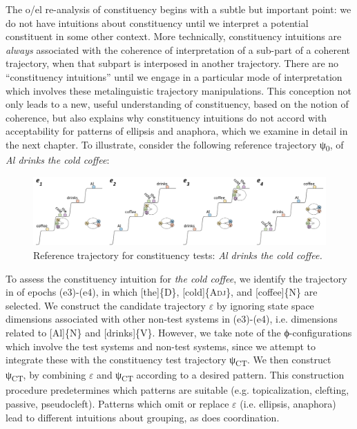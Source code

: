 \ea\label{ex:6:22}
  \z
\z

  The o/el re-analysis of constituency begins with a subtle but important point: we do not have intuitions about constituency until we interpret a potential constituent in some other context. More technically, constituency intuitions are \textit{always} associated with the coherence of interpretation of a sub-part of a coherent trajectory, when that subpart is interposed in another trajectory. There are no “constituency intuitions” until we engage in a particular mode of interpretation which involves these metalinguistic trajectory manipulations. This conception not only leads to a new, useful understanding of constituency, based on the notion of coherence, but also explains why constituency intuitions do not accord with acceptability for patterns of ellipsis and anaphora, which we examine in detail in the next chapter. To illustrate, consider the following reference trajectory ψ\textsubscript{0}, of \textit{Al drinks the cold coffee}:

  
\begin{figure}
\includegraphics[width=\textwidth]{figures/Tilsen-img137.png}
\caption{Reference trajectory for constituency tests: \textit{Al drinks the cold coffee.}}
\label{fig:6:18}
\end{figure}
  

  To assess the constituency intuition for \textit{the cold coffee}, we identify the trajectory in {} of epochs (e3)-(e4), in which [the]\{D\}, [cold]\{A\textsc{dj}\}, and [coffee]\{N\} are selected. We construct the candidate trajectory $\varepsilon $ by ignoring state space dimensions associated with other non-test systems in (e3)-(e4), i.e. dimensions related to [Al]\{N\} and [drinks]\{V\}. However, we take note of the ϕ-configurations which involve the test systems and non-test systems, since we attempt to integrate these with the constituency test trajectory ψ\textsubscript{CT}. We then construct ψ\textsubscript{CT}, by combining $\varepsilon $ and ψ\textsubscript{CT} according to a desired pattern. This construction procedure predetermines which patterns are suitable (e.g. topicalization, clefting, passive, pseudocleft). Patterns which omit or replace $\varepsilon $ (i.e. ellipsis, anaphora) lead to different intuitions about grouping, as does coordination.

